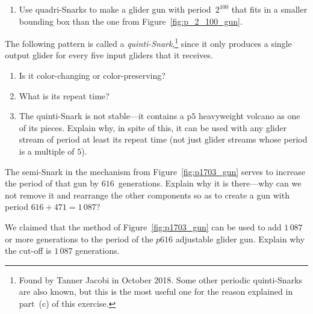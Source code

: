 \begin{multicols}{2}
\begin{problem}
\begin{enumerate}[label=\bf\color{ocre}(\alph*)]
			\item Use quadri-Snarks to make a glider gun with period~$2^{100}$ that fits in a smaller bounding box than the one from Figure~\ref{fig:p_2_100_gun}.
		\end{enumerate}
	\end{problem}
	
	
	\mfilbreak
	
	
	\begin{problem}\label{exer:quinti_snark}
		The following pattern is called a \emph{quinti-Snark},\footnote{Found by Tanner Jacobi in October 2018. Some other periodic quinti-Snarks are also known, but this is the most useful one for the reason explained in part~(c) of this exercise.} since it only produces a single output glider for every five input gliders that it receives.
		
		\begin{center}
		\end{center}
		
		\begin{enumerate}[label=\bf\color{ocre}(\alph*)]
			\item Is it color-changing or color-preserving?%
			
			\item What is its repeat time?
			
			\item The quinti-Snark is not stable---it contains a p$5$ heavyweight volcano as one of its pieces. Explain why, in spite of this, it can be used with any glider stream of period at least its repeat time (not just glider streams whose period is a multiple of $5$).
		\end{enumerate}
	\end{problem}
	
	
	\mfilbreak
	
	
	\begin{problem}\label{exer:p1703_gun_why_semisnark}
		The semi-Snark in the mechanism from Figure~\ref{fig:p1703_gun} serves to increase the period of that gun by $616$~generations. Explain why it is there---why can we not remove it and rearrange the other components so as to create a gun with period $616+471 = 1\, 087$?
	\end{problem}
	
	
	\mfilbreak
	
	
	\begin{problem}\label{exer:p1703_gun}
		We claimed that the method of Figure~\ref{fig:p1703_gun} can be used to add $1\, 087$ or more generations to the period of the $p616$ adjustable glider gun. Explain why the cut-off is $1\, 087$ generations.
		

\end{problem}
\end{multicols}
